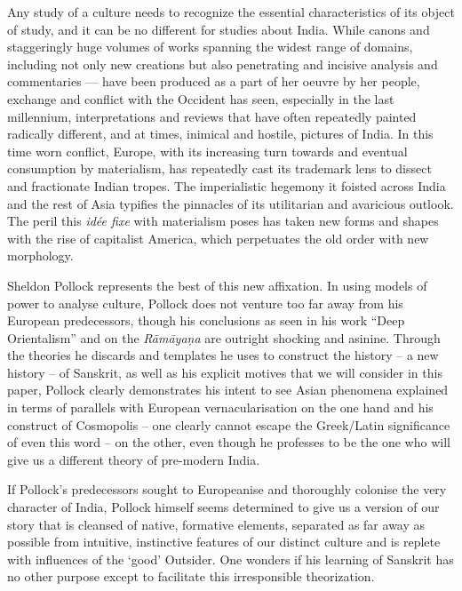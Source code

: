 Any study of a culture needs to recognize the essential characteristics of its object of study, and it can be no different for studies about India. While canons and staggeringly huge volumes of works spanning the widest range of domains, including not only new creations but also penetrating and incisive analysis and commentaries — have been produced as a part of her oeuvre by her people, exchange and conflict with the Occident has seen, especially in the last millennium, interpretations and reviews that have often repeatedly painted radically different, and at times, inimical and hostile, pictures of India. In this time worn conflict, Europe, with its increasing turn towards and eventual consumption by materialism, has repeatedly cast its trademark lens to dissect and fractionate Indian tropes. The imperialistic hegemony it foisted across India and the rest of Asia typifies the pinnacles of its utilitarian and avaricious outlook. The peril this \textit{idée fixe} with materialism poses has taken new forms and shapes with the rise of capitalist America, which perpetuates the old order with new morphology.

Sheldon Pollock represents the best of this new affixation. In using models of power to analyse culture, Pollock does not venture too far away from his European predecessors, though his conclusions as seen in his work “Deep Orientalism” and on the \textit{Rāmāyaṇa} are outright shocking and asinine. Through the theories he discards and templates he uses to construct the history – a new history – of Sanskrit, as well as his explicit motives that we will consider in this paper, Pollock clearly demonstrates his intent to see Asian phenomena explained in terms of parallels with European vernacularisation on the one hand and his construct of Cosmopolis – one clearly cannot escape the Greek/Latin significance of even this word – on the other, even though he professes to be the one who will give us a different theory of pre-modern India.

If Pollock’s predecessors sought to Europeanise and thoroughly colonise the very character of India, Pollock himself seems determined to give us a version of our story that is cleansed of native, formative elements, separated as far away as possible from intuitive, instinctive features of our distinct culture and is replete with influences of the ‘good’ Outsider. One wonders if his learning of Sanskrit has no other purpose except to facilitate this irresponsible theorization.

